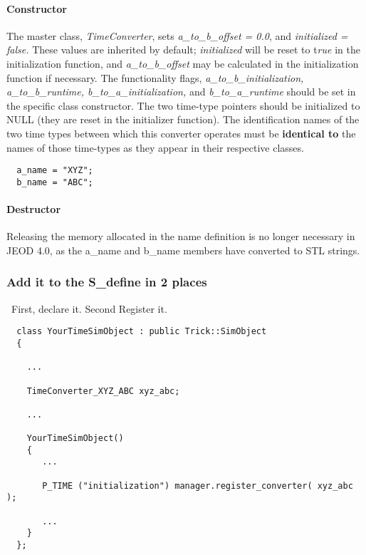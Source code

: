 \paragraph{Constructor}
The master class, \textit{TimeConverter}, sets \textit{a\_to\_b\_offset = 0.0},
and \textit{initialized = false. } These values are inherited by
default; \textit{initialized} will be reset to t\textit{rue} in the
initialization function, and \textit{a\_to\_b\_offset} may be
calculated in the initialization function if necessary.  The
functionality flags, \textit{a\_to\_b\_initialization,
a\_to\_b\_runtime, b\_to\_a\_initialization,} and
\textit{b\_to\_a\_runtime} should be set in the specific class
constructor.  The two time-type pointers should be initialized to NULL
(they are reset in the initializer function).  The identification names
of the two time types between which this converter operates must be \textbf{identical to} the names of those time-types as
they appear in their respective classes.

\begin{verbatim}
  a_name = "XYZ";
  b_name = "ABC";
\end{verbatim}

\paragraph[Destructor]{Destructor}
Releasing the memory allocated in the name definition is no longer necessary in JEOD 4.0, as the a\_name and b\_name members have converted to STL strings.

\subsubsection[Add it to the S\_define in 2 places]{\rmfamily\bfseries Add
it to the S\_define in 2 places}
\ First, declare it. Second Register it.

\begin{verbatim}
  class YourTimeSimObject : public Trick::SimObject
  {

    ...

    TimeConverter_XYZ_ABC xyz_abc;

    ...

    YourTimeSimObject()
    {
       ...

       P_TIME ("initialization") manager.register_converter( xyz_abc );

       ...
    }
  };
\end{verbatim}

